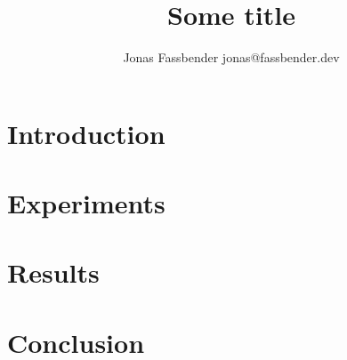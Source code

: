 \documentclass[twoside,11pt]{article}
\title{Some title}
\author{\name Jonas Fassbender
        \email jonas@fassbender.dev}
\begin{document}
\maketitle

\begin{abstract}
\end{abstract}

\begin{keywords}
\end{keywords}

\section{Introduction}

\begin{center}







\end{center}

\section{Experiments}

\section{Results}

\section{Conclusion}
\end{document}
